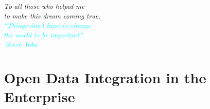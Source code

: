 \documentclass[a4paper,11pt,twoside]{ThesisStyle}
\begin{document}


\vspace{3cm}

\clearpage

\vspace{40ex}
\begin{flushright}

\textit{To all those who helped me \\
to make this dream coming true. } \\

\textcolor{cyan}{
\textit{``Things don't have to change \\
the world to be important''. \\}
     -Steve Jobs -
}

\end{flushright}






\tableofcontents

\listoffigures

\listoftables


\mainmatter


\clearpage


\clearpage

\part{Open Data Integration in the Enterprise} \label{pa:opendata_in_the_enterprise}




\end{document}
